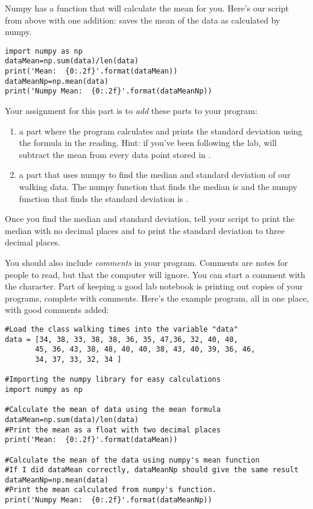 \documentclass[twoside,11pt,ShortChapTitles]{BYUTextbook}
\begin{document}
Numpy has a function that will calculate the mean for you.  Here's our script from above with one addition:  saves the mean of the data as calculated by numpy.
\begin{lstlisting}
import numpy as np
dataMean=np.sum(data)/len(data)
print('Mean:  {0:.2f}'.format(dataMean))
dataMeanNp=np.mean(data)
print('Numpy Mean:  {0:.2f}'.format(dataMeanNp))

\end{lstlisting}


Your assignment for this part is to {\em add} these parts to your program:
\begin{enumerate}
\item a part where the program calculates and prints the standard deviation using the formula in the reading. Hint: if you've been following the lab,  will subtract the mean from every data point stored in .
\item a part that uses numpy to find the median and standard deviation of our walking data.  The numpy function that finds the median is  and the numpy function that finds the standard deviation is .
\end{enumerate}
Once you find the median and standard deviation, tell your script to print the median with no decimal places and to print the standard deviation to three decimal places.

You should also include {\em comments} in your program.  Comments are notes for people to read, but that the computer will ignore.  You can start a comment with the \code{#} character.  Part of keeping a good lab notebook is printing out copies of your programs, complete with comments. Here's the example program, all in one place, with good comments added:
\begin{lstlisting}
#Load the class walking times into the variable "data"
data = [34, 38, 33, 38, 38, 36, 35, 47,36, 32, 40, 40,
       45, 36, 43, 38, 48, 40, 40, 38, 43, 40, 39, 36, 46,
       34, 37, 33, 32, 34 ]

#Importing the numpy library for easy calculations
import numpy as np

#Calculate the mean of data using the mean formula
dataMean=np.sum(data)/len(data)
#Print the mean as a float with two decimal places
print('Mean:  {0:.2f}'.format(dataMean))

#Calculate the mean of the data using numpy's mean function
#If I did dataMean correctly, dataMeanNp should give the same result
dataMeanNp=np.mean(data)
#Print the mean calculated from numpy's function.
print('Numpy Mean:  {0:.2f}'.format(dataMeanNp))

\end{lstlisting}
\end{document}
